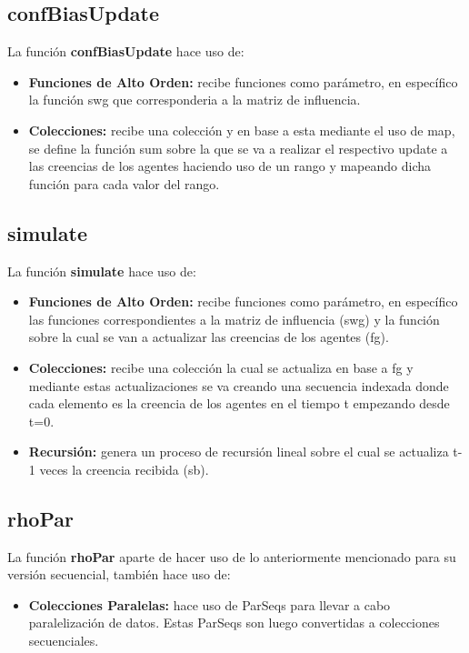 \documentclass{article}
\begin{document}
    \subsection{confBiasUpdate}
    La función \textbf{confBiasUpdate} hace uso de:

    \begin{itemize}
      \item \textbf{Funciones de Alto Orden:} recibe funciones como parámetro, en específico la función swg que corresponderia a la matriz de influencia.
      \item \textbf{Colecciones:} recibe una colección y en base a esta mediante el uso de map, se define la función sum sobre la que se va a realizar el respectivo update a las creencias de los agentes haciendo uso de un rango y mapeando dicha función para cada valor del rango.
    \end{itemize}

    \subsection{simulate}
    La función \textbf{simulate} hace uso de:

    \begin{itemize}
      \item \textbf{Funciones de Alto Orden:} recibe funciones como parámetro, en específico las funciones correspondientes a la matriz de influencia (swg) y la función sobre la cual se van a actualizar las creencias de los agentes (fg).
      \item \textbf{Colecciones:} recibe una colección la cual se actualiza en base a fg y mediante estas actualizaciones se va creando una secuencia indexada donde cada elemento es la creencia de los agentes en el tiempo t empezando desde t=0.
      \item \textbf{Recursión:} genera un proceso de recursión lineal sobre el cual se actualiza t-1 veces la creencia recibida (sb).
    \end{itemize}

    \subsection{rhoPar}
    La función \textbf{rhoPar} aparte de hacer uso de lo anteriormente mencionado para su versión secuencial, también hace uso de:

    \begin{itemize}
      \item \textbf{Colecciones Paralelas:} hace uso de ParSeqs para llevar a cabo paralelización de datos. Estas ParSeqs son luego convertidas a colecciones secuenciales.
    \end{itemize}
\end{document}

